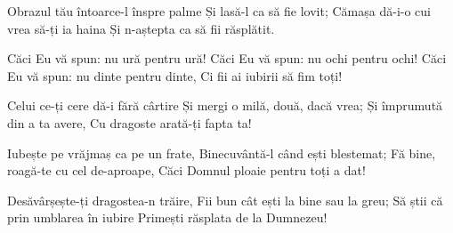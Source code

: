 \beginverse
Obrazul tău întoarce-l înspre palme
Și lasă-l ca să fie lovit;
Cămașa dă-i-o cui vrea să-ți ia haina
Și n-aștepta ca să fii răsplătit.
\endverse

\beginchorus
Căci Eu vă spun: nu ură pentru ură!
Căci Eu vă spun: nu ochi pentru ochi!
Căci Eu vă spun: nu dinte pentru dinte,
Ci fii ai iubirii să fim toți!
\endchorus

\beginverse
Celui ce-ți cere dă-i fără cârtire
Și mergi o milă, două, dacă vrea;
Și împrumută din a ta avere,
Cu dragoste arată-ți fapta ta!
\endverse

\beginverse
Iubește pe vrăjmaș ca pe un frate,
Binecuvântă-l când ești blestemat;
Fă bine, roagă-te cu cel de-aproape,
Căci Domnul ploaie pentru toți a dat!
\endverse

\beginverse
Desăvârșește-ți dragostea-n trăire,
Fii bun cât ești la bine sau la greu;
Să știi că prin umblarea în iubire
Primești răsplata de la Dumnezeu!
\endverse
\endsong